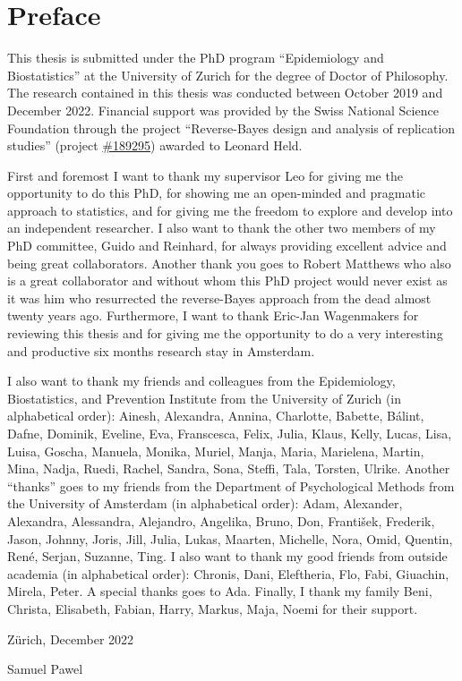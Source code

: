 \section*{Preface}

This thesis is submitted under the PhD program ``Epidemiology and
Biostatistics'' at the University of Zurich for the degree of Doctor of
Philosophy.
The research contained in this thesis was conducted between October 2019 and
December 2022. Financial support was provided by the Swiss National Science
Foundation through the project ``Reverse-Bayes design and analysis of
replication studies'' (project
\href{https://data.snf.ch/grants/grant/189295}{\#189295}) awarded to Leonard
Held.

First and foremost I want to thank my supervisor Leo for giving me the
opportunity to do this PhD, for showing me an open-minded and pragmatic approach
to statistics, and for giving me the freedom to explore and develop into an
independent researcher. I also want to thank the other two members of my PhD
committee, Guido and Reinhard, for always providing excellent advice and being
great collaborators. Another thank you goes to Robert Matthews who also is a
great collaborator and without whom this PhD project would never exist as it was
him who resurrected the reverse-Bayes approach from the dead almost twenty years
ago. Furthermore, I want to thank Eric-Jan Wagenmakers for reviewing this thesis
and for giving me the opportunity to do a very interesting and productive six
months research stay in Amsterdam.

I also want to thank my friends and colleagues from the Epidemiology,
Biostatistics, and Prevention Institute from the University of Zurich (in
alphabetical order): Ainesh, Alexandra, Annina, Charlotte, Babette, Bálint,
Dafne, Dominik, Eveline, Eva, Franscesca, Felix, Julia, Klaus, Kelly, Lucas,
Lisa, Luisa, Goscha, Manuela, Monika, Muriel, Manja, Maria, Marielena, Martin,
Mina, Nadja, Ruedi, Rachel, Sandra, Sona, Steffi, Tala, Torsten, Ulrike. Another
``thanks'' goes to my friends from the Department of Psychological Methods from
the University of Amsterdam (in alphabetical order): Adam, Alexander, Alexandra,
Alessandra, Alejandro, Angelika, Bruno, Don, František, Frederik, Jason, Johnny,
Joris, Jill, Julia, Lukas, Maarten, Michelle, Nora, Omid, Quentin, René, Serjan,
Suzanne, Ting. I also want to thank my good friends from outside academia (in
alphabetical order): Chronis, Dani, Eleftheria, Flo, Fabi, Giuachin, Mirela,
Peter. A special thanks goes to Ada. Finally, I thank my family Beni, Christa,
Elisabeth, Fabian, Harry, Markus, Maja, Noemi for their support.

\begin{flushright}
  \hfill Zürich, December 2022

  \hfill Samuel Pawel
\end{flushright}

